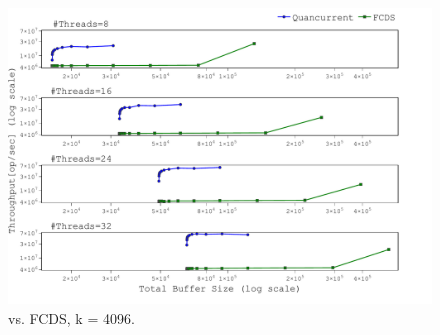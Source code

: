 
\begin{figure}[h]
\includegraphics[width=\textwidth,trim={0cm 0cm 0cm 0cm},clip]
{graphics/graphs/FCDS/oracle_Quancurrent_vs_FCDS_block_numa_up_k4096_keys10M_T8-32_runs15_equal_relax_log_largeB_rm_last2_diff_axes_name_16-09-2022_18-59-50.pdf}
\caption{\mysketch vs. FCDS, k = 4096.}
\label{fig:compare_FCDS_k4096}
\end{figure}
